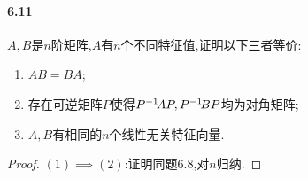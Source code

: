 \documentclass[11pt]{article}
\begin{document}
\paragraph{6.11}$A,B$是$n$阶矩阵,$A$有$n$个不同特征值,证明以下三者等价:
\begin{enumerate}
    \item $AB=BA$;
    \item 存在可逆矩阵$P$使得$P^{-1}\! AP, P^{-1}\! BP$均为对角矩阵;
    \item $A,B$有相同的$n$个线性无关特征向量.
\end{enumerate}
\begin{proof}
    $(1)\implies (2)$:证明同题6.8,对$n$归纳.
\end{proof}
\end{document}
